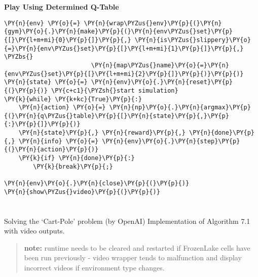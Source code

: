     \textbf{Play Using Determined Q-Table}

    \begin{tcolorbox}[breakable, size=fbox, boxrule=1pt, pad at break*=1mm,colback=cellbackground, colframe=cellborder]
\begin{Verbatim}[commandchars=\\\{\}]
\PY{n}{env} \PY{o}{=} \PY{n}{wrap\PYZus{}env}\PY{p}{(}\PY{n}{gym}\PY{o}{.}\PY{n}{make}\PY{p}{(}\PY{n}{env\PYZus{}set}\PY{p}{[}\PY{l+m+mi}{0}\PY{p}{]}\PY{p}{,} \PY{n}{is\PYZus{}slippery}\PY{o}{=}\PY{n}{env\PYZus{}set}\PY{p}{[}\PY{l+m+mi}{1}\PY{p}{]}\PY{p}{,} \PYZbs{}
                        \PY{n}{map\PYZus{}name}\PY{o}{=}\PY{n}{env\PYZus{}set}\PY{p}{[}\PY{l+m+mi}{2}\PY{p}{]}\PY{p}{)}\PY{p}{)}
\PY{n}{state} \PY{o}{=} \PY{n}{env}\PY{o}{.}\PY{n}{reset}\PY{p}{(}\PY{p}{)} \PY{c+c1}{\PYZsh{}start simulation}
\PY{k}{while} \PY{k+kc}{True}\PY{p}{:}
    \PY{n}{action} \PY{o}{=} \PY{n}{np}\PY{o}{.}\PY{n}{argmax}\PY{p}{(}\PY{n}{q\PYZus{}table}\PY{p}{[}\PY{n}{state}\PY{p}{,}\PY{p}{:}\PY{p}{]}\PY{p}{)}   
    \PY{n}{state}\PY{p}{,} \PY{n}{reward}\PY{p}{,} \PY{n}{done}\PY{p}{,} \PY{n}{info} \PY{o}{=} \PY{n}{env}\PY{o}{.}\PY{n}{step}\PY{p}{(}\PY{n}{action}\PY{p}{)}   
    \PY{k}{if} \PY{n}{done}\PY{p}{:} 
        \PY{k}{break}\PY{p}{;}
            
\PY{n}{env}\PY{o}{.}\PY{n}{close}\PY{p}{(}\PY{p}{)}
\PY{n}{show\PYZus{}video}\PY{p}{(}\PY{p}{)}
\end{Verbatim}
\end{tcolorbox}

    \hypertarget{deep-q-learning}{%
\section{\texorpdfstring{}{Deep Q-Learning}}\label{deep-q-learning}}


Solving the `Cart-Pole' problem (by OpenAI) \textbar{} Implementation of
Algorithm 7.1 with video outputs.


\begin{quote}
\textbf{note:} runtime needs to be cleared and restarted if FrozenLake
cells have been run previously - video wrapper tends to malfunction and
display incorrect videos if environment type changes.
\end{quote}

